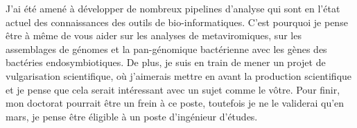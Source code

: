 \documentclass[11pt, a4paper]{awesome-cv}
\begin{document}
\begin{cvletter}
J’ai été amené à développer de nombreux pipelines d’analyse qui sont en l’état actuel des connaissances des outils de bio-informatiques. C’est pourquoi je pense être à même de vous aider sur les analyses de metaviromiques, sur les assemblages de génomes et la pan-génomique bactérienne avec les gènes des bactéries endosymbiotiques. De plus, je suis en train de mener un projet de vulgarisation scientifique, où j’aimerais mettre en avant la production scientifique et je pense que cela serait intéressant avec un sujet comme le vôtre. Pour finir, mon doctorat pourrait être un frein à ce poste, toutefois je ne le validerai qu’en mars, je pense être éligible à un poste d’ingénieur d'études.


\end{cvletter}


\makeletterclosing
\end{document}
